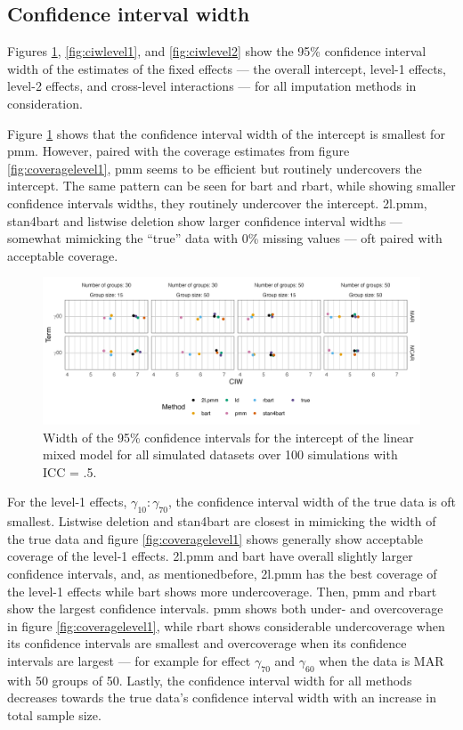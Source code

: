 \documentclass[10pt, a4paper, titlepage]{article}
\begin{document}
\subsection{Confidence interval width}
Figures \ref{fig:ciwintercept}, \ref{fig:ciwlevel1}, and \ref{fig:ciwlevel2} show the 95\% confidence interval width of the estimates of the fixed effects --- the overall intercept, level-1 effects, level-2 effects, and cross-level interactions --- for all imputation methods in consideration.

Figure \ref{fig:ciwintercept} shows that the confidence interval width of the intercept is smallest for pmm. However, paired with the coverage estimates from figure \ref{fig:coveragelevel1}, pmm seems to be efficient but routinely undercovers the intercept. The same pattern can be seen for bart and rbart, while showing smaller confidence intervals widths, they routinely undercover the intercept. 2l.pmm, stan4bart and listwise deletion show larger confidence interval widths --- somewhat mimicking the ``true'' data with 0\% missing values --- oft paired with acceptable coverage.

\begin{figure}[H]
    \centering
    \includegraphics[width=1\textwidth]{ciwintercept.png}
    \caption{Width of the 95\% confidence intervals for the intercept of the linear mixed model for all simulated datasets over 100 simulations with ICC = .5.}
    \label{fig:ciwintercept}
\end{figure}

For the level-1 effects, $\gamma_{10}:\gamma_{70}$, the confidence interval width of the true data is oft smallest. Listwise deletion and stan4bart are closest in mimicking the width of the true data and figure \ref{fig:coveragelevel1} shows generally show acceptable coverage of the level-1 effects. 2l.pmm and bart have overall slightly larger confidence intervals, and, as mentionedbefore, 2l.pmm has the best coverage of the level-1 effects while bart shows more undercoverage. Then, pmm and rbart show the largest confidence intervals. pmm shows both under- and overcoverage in figure \ref{fig:coveragelevel1}, while rbart shows considerable undercoverage when its confidence intervals are smallest and overcoverage when its confidence intervals are largest --- for example for effect $\gamma_{70}$ and $\gamma_{60}$ when the data is MAR with 50 groups of 50. Lastly, the confidence interval width for all methods decreases towards the true data's confidence interval width with an increase in total sample size. 
\end{document}

